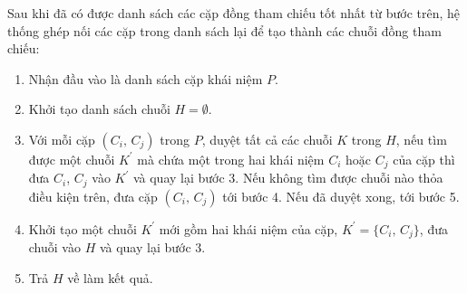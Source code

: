 Sau khi đã có được danh sách các cặp đồng tham chiếu tốt nhất từ bước trên, hệ thống ghép nối các cặp trong danh sách lại để tạo thành các chuỗi đồng tham chiếu:
\begin{enumerate}
\item Nhận đầu vào là danh sách cặp khái niệm $P$.
\item Khởi tạo danh sách chuỗi $H=\emptyset$.
\item Với mỗi cặp $(C_i,\,C_j)$ trong $P$, duyệt tất cả các chuỗi $K$ trong $H$, nếu tìm được một chuỗi $K^{\prime}$ mà chứa một trong hai khái niệm $C_i$ hoặc $C_j$ của cặp thì đưa $C_i$, $C_j$ vào $K^{\prime}$ và quay lại bước 3. Nếu không tìm được chuỗi nào thỏa điều kiện trên, đưa cặp $(C_i,\,C_j)$ tới bước 4. Nếu đã duyệt xong, tới bước 5.
\item Khởi tạo một chuỗi $K^{\prime}$ mới gồm hai khái niệm của cặp, $K^{\prime}=\{C_i,\,C_j\}$, đưa chuỗi vào $H$ và quay lại bước 3.
\item Trả $H$ về làm kết quả.
\end{enumerate}

